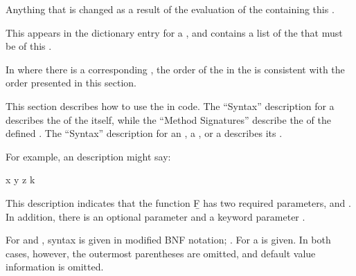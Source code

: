 \endsubsubsection%


Anything that is changed as a result of the
evaluation of the  containing this .

\endsubsubsection%


This appears in the dictionary entry for a ,
and contains a list of the   
that must be  of this .

In  where there is a corresponding ,
the order of the  in the  
is consistent with the order presented in this section.

\endsubsubsection%


This section describes how to use the  in code.
The ``Syntax'' description for a  
describes the  of the  itself, 
while the ``Method Signatures'' describe the  
of the defined .
The ``Syntax'' description for 
     an ,
     a ,
  or a 
describes its .

For example, an  description might say:

 {x y {\opt} z {\key} k}

\noindent This description indicates that the function \b{F} 
has two required parameters,  and .  In addition,
there is an optional parameter  and a keyword parameter .

For  and , syntax is given 
in modified BNF notation; \seesection\ModifiedBNF.
For  a  is given.
In both cases, however, the outermost parentheses are omitted,
and default value information is omitted.


